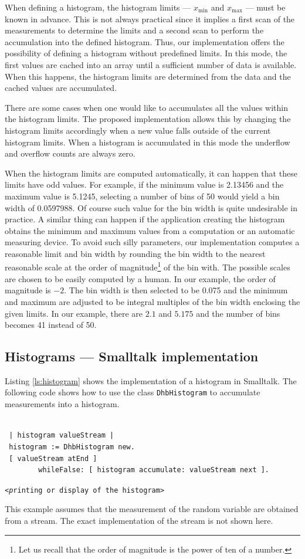 When defining a histogram, the histogram limits --- $x_{\min}$ and
$x_{\max}$ --- must be known in advance. This is not always
practical since it implies a first scan of the measurements to
determine the limits and a second scan to perform the accumulation
into the defined histogram. Thus, our implementation offers the
possibility of defining a histogram without predefined limits. In
this mode, the first values are cached into an array until a
sufficient number of data is available. When this happens, the
histogram limits are determined from the data and the cached
values are accumulated.

There are some cases when one would like to accumulates all the
values within the histogram limits. The proposed implementation
allows this by changing the histogram limits accordingly when a
new value falls outside of the current histogram limits. When a
histogram is accumulated in this mode the underflow and overflow
counts are always zero.

When the histogram limits are computed automatically, it can
happen that these limits have odd values. For example, if the
minimum value is 2.13456 and the maximum value is 5.1245,
selecting a number of bins of 50 would yield a bin width of
0.0597988. Of course such value for the bin width is quite
undesirable in practice. A similar thing can happen if the
application creating the histogram obtains the minimum and maximum
values from a computation or an automatic measuring device. To
avoid such silly parameters, our implementation computes a
reasonable limit and bin width by rounding the bin width to the
nearest reasonable scale at the order of magnitude\footnote{Let us
recall that the order of magnitude is the power of ten of a
number.} of the bin with. The possible scales are chosen to be
easily computed by a human. In our example, the order of magnitude
is $-2$. The bin width is then selected to be 0.075 and the
minimum and maximum are adjusted to be integral multiples of the
bin width enclosing the given limits. In our example, there are
$2.1$ and $5.175$ and the number of bins becomes 41 instead of 50.

\subsection{Histograms --- Smalltalk implementation}
\label{sec:shistogram} Listing \ref{ls:histogram} shows the
implementation of a histogram in Smalltalk. The following code
shows how to use the class {\tt DhbHistogram} to accumulate
measurements into a histogram.
\begin{codeExample}
\begin{verbatim}

 | histogram valueStream |
 histogram := DhbHistogram new.
 [ valueStream atEnd ]
        whileFalse: [ histogram accumulate: valueStream next ].
\end{verbatim}
\hfil {\tt<\textsl printing or display of the histogram\tt >}\hfil
\end{codeExample}
This example assumes that the measurement of the random variable
are obtained from a stream. The exact implementation of the stream
is not shown here.

